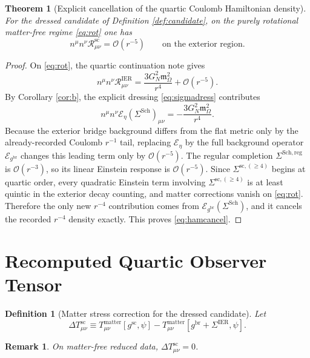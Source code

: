 \documentclass[11pt]{article}
\newcommand{\ReBridge}{g^{\mathrm{br}}}
\newcommand{\OpMetricSC}{g^{\mathrm{sc}}}
\newcommand{\SigmaIER}{\Sigma^{\mathrm{IER}}}
\newcommand{\SigmaSRFourSC}{\Sigma^{\mathrm{sc},(\ge 4)}}
\newcommand{\SigmaDressSch}{\Sigma^{\mathrm{Sch}}}
\newcommand{\SigmaRegSch}{\Sigma^{\mathrm{Sch,reg}}}
\newcommand{\EinLin}{\mathcal E_{\ReBridge}}
\newcommand{\EinLinFlat}{\mathcal E_{\eta}}
\newcommand{\HamChargeOmega}{\mathfrak m_{\Omega}}
\newcommand{\DeltaTSC}{\Delta T_{\mu\nu}^{\mathrm{sc}}}
\newtheorem{definition}{Definition}
\newtheorem{remark}{Remark}
\newtheorem{theorem}{Theorem}
\begin{document}
\begin{theorem}[Explicit cancellation of the quartic Coulomb Hamiltonian density]
\label{thm:ham}
For the dressed candidate of Definition \ref{def:candidate}, on the purely rotational matter-free regime \eqref{eq:rot} one has
\begin{equation}
n^\mu n^\nu \mathcal R_{\mu\nu}^{\mathrm{sc}}
=
\mathcal O(r^{-5})
\qquad
\text{on the exterior region}.
\label{eq:hamcancel}
\end{equation}
\end{theorem}

\begin{proof}
On \eqref{eq:rot}, the quartic continuation note gives
\[
n^\mu n^\nu \mathcal R_{\mu\nu}^{\mathrm{IER}}
=
\frac{3G_N^2\HamChargeOmega^2}{r^4}
+\mathcal O(r^{-5}).
\]
By Corollary \ref{cor:b}, the explicit dressing \eqref{eq:sigmadress} contributes
\[
n^\mu n^\nu \EinLinFlat(\SigmaDressSch)_{\mu\nu}
=
-\frac{3G_N^2\HamChargeOmega^2}{r^4}.
\]
Because the exterior bridge background differs from the flat metric only by the already-recorded Coulomb \(r^{-1}\) tail, replacing \(\EinLinFlat\) by the full background operator \(\EinLin\) changes this leading term only by \(\mathcal O(r^{-5})\).
The regular completion \(\SigmaRegSch\) is \(\mathcal O(r^{-3})\), so its linear Einstein response is \(\mathcal O(r^{-5})\). Since \(\SigmaSRFourSC\) begins at quartic order, every quadratic Einstein term involving \(\SigmaSRFourSC\) is at least quintic in the exterior decay counting, and matter corrections vanish on \eqref{eq:rot}. Therefore the only new \(r^{-4}\) contribution comes from \(\EinLin(\SigmaDressSch)\), and it cancels the recorded \(r^{-4}\) density exactly. This proves \eqref{eq:hamcancel}.
\end{proof}

\section{Recomputed Quartic Observer Tensor}

\begin{definition}[Matter stress correction for the dressed candidate]
\label{def:deltat}
Let
\begin{equation}
\DeltaTSC
\equiv
T_{\mu\nu}^{\mathrm{matter}}[\OpMetricSC,\psi]
-T_{\mu\nu}^{\mathrm{matter}}[\ReBridge+\SigmaIER,\psi].
\label{eq:deltat}
\end{equation}
\end{definition}

\begin{remark}
On matter-free reduced data, \(\DeltaTSC=0\).
\end{remark}
\end{document}
